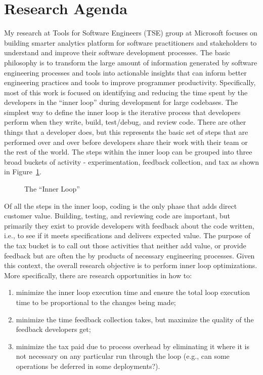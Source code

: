 \documentclass[a4paper]{article}
\begin{document}
\section*{Research Agenda}

My research at Tools for Software Engineers (TSE) group at Microsoft focuses on
building smarter analytics platform for software practitioners and stakeholders
to understand and improve their software development processes. The basic philosophy
is to transform the large amount of information generated by software engineering processes
and tools into actionable insights that can inform better engineering practices and tools to improve programmer productivity. 
Specifically, most of this work is focused on identifying and reducing the time spent by the developers in the \enquote{inner loop} during development for large codebases. The simplest way to define the inner loop is the iterative process that developers perform when they write, build, test/debug, and review code. There are other things that a developer does, but this represents the basic set of steps that are performed over and over before developers share their work with their team or the rest of the world. The steps within the inner loop can be grouped into three broad buckets of activity - experimentation, feedback collection, and tax as shown in Figure~\ref{fig:innerloop}. 

\begin{figure}[h]
  \centering
  
\caption{The \enquote{Inner Loop}}
  \label{fig:innerloop}
\end{figure}


Of all the steps in the inner loop, coding is the only phase that adds direct customer value. Building, testing, and reviewing code are important, but primarily they exist to provide developers with feedback about the code written, i.e., to see if it meets specifications and delivers expected value.
The purpose of the tax bucket is to call out those activities that neither add value, or provide feedback but are often the by products of necessary engineering processes. %
Given this context, the overall research objective is to perform inner loop optimizations.  %
More specifically, there are research opportunities in how to:
\begin{enumerate}
\item minimize the inner loop execution time and ensure the total loop execution time to be proportional to the changes being made; 
\vspace{-5pt}\item minimize the time feedback collection takes, but maximize the quality of the feedback developers get; 
\vspace{-5pt}\item minimize the tax paid due to process overhead by eliminating it where it is not necessary on any particular run through the loop (e.g., can some operations be deferred in some deployments?).
\end{enumerate}
\end{document}
